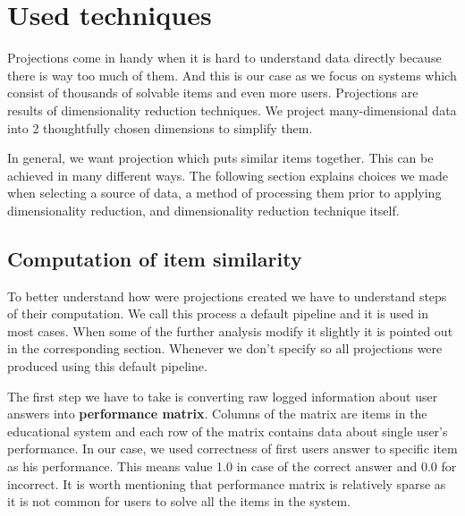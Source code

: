 \documentclass[
  digital, %
  table,   %
  nolof,     %
  nolot,     %
  nocover,
  color
]{fithesis3}
\begin{document}

\section{Used techniques}\label{Used techniques}


Projections come in handy when it is hard to understand data directly because there is way too much of them. And this is our case as we focus on systems which consist of thousands of solvable items and even more users. Projections are results of dimensionality reduction techniques. We project many-dimensional data into 2 thoughtfully chosen dimensions to simplify them.


In general, we want projection which puts similar items together. This can be achieved in many different ways. The following section explains choices we made when selecting a source of data, a method of processing them prior to applying dimensionality reduction, and dimensionality reduction technique itself.


\subsection{Computation of item similarity}\label{computation-of-item-similarity}


To better understand how were projections created we have to understand steps of their computation. We call this process a default pipeline and it is used in most cases. When some of the further analysis modify it slightly it is pointed out in the corresponding section. Whenever we don't specify so all projections were produced using this default pipeline.


The first step we have to take is converting raw logged information about user answers into \textbf{performance matrix}. Columns of the matrix are items in the educational system and each row of the matrix contains data about single user's performance. In our case, we used correctness of first users answer to specific item as his performance. This means value 1.0 in case of the correct answer and 0.0 for incorrect. It is worth mentioning that performance matrix is relatively sparse as it is not common for users to solve all the items in the system.
\end{document}
